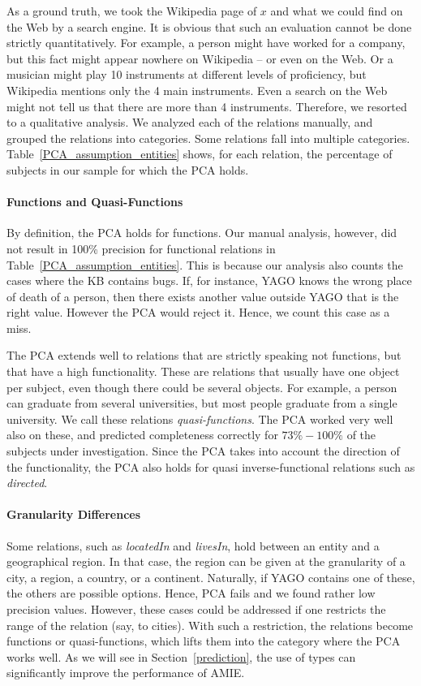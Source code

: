 As a ground truth, we took the Wikipedia page of $x$ and what we could find on the Web by a search engine.
It is obvious that such an evaluation cannot be done strictly quantitatively.
For example, a person might have worked for a company, but this fact might appear nowhere on Wikipedia -- or even on the Web.
Or a musician might play 10 instruments at different levels of proficiency, but Wikipedia mentions only the 4 main instruments.
Even a search on the Web might not tell us that there are more than 4 instruments.
Therefore, we resorted to a qualitative analysis.
We analyzed each of the relations manually, and grouped the relations into categories.
Some relations fall into multiple categories.
Table~\ref{PCA_assumption_entities} shows, for each relation, the percentage of subjects in our sample for which the PCA holds.

\paragraph{Functions and Quasi-Functions} By definition, the PCA holds for functions. Our manual analysis, however, did not result in 100\% precision for functional relations in Table~\ref{PCA_assumption_entities}.
This is because our analysis also counts the cases where the KB contains bugs. If, for instance, YAGO knows the wrong place of death of a person, then there exists another value outside YAGO that is the right value. However the PCA would reject it. Hence, we count this case as a miss.

The PCA extends well to relations that are strictly speaking not functions, but that have a high functionality.
These are relations that usually have one object per subject, even though there could be several objects.
For example, a person can graduate from several universities, but most people graduate from a single university. We call these relations \emph{quasi-functions}.
The PCA worked very well also on these, and predicted completeness correctly for $73\%-100\%$
of the subjects under investigation. Since the PCA takes into account the direction of the functionality, the PCA also holds for quasi inverse-functional relations such as \emph{directed}.

\paragraph{Granularity Differences} Some relations, such as \emph{locatedIn} and \emph{livesIn}, hold between an entity and a geographical region.
In that case, the region can be given at the granularity of a city, a region, a country, or a continent.
Naturally, if YAGO contains one of these, the others are possible options. Hence, PCA fails and we found rather low precision values.
However, these cases could be addressed if one restricts the range of the relation (say, to cities).
With such a restriction, the relations become functions or quasi-functions, which lifts them into the category where the PCA works well.
As we will see in Section~\ref{prediction}, the use of types can significantly improve the performance of AMIE.

